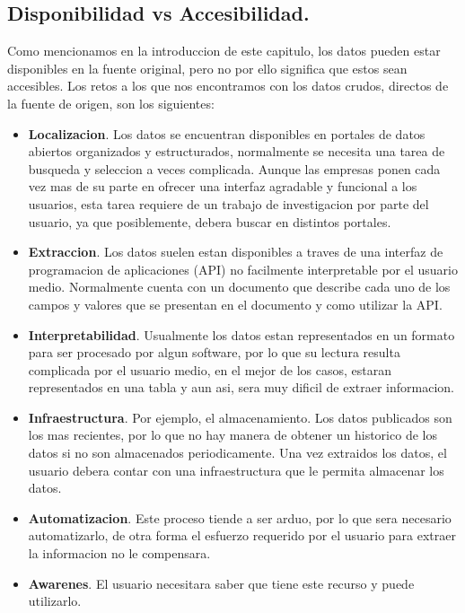 \subsection{Disponibilidad vs Accesibilidad.}
    
Como mencionamos en la introduccion de este capitulo, los datos pueden estar disponibles en la fuente original, pero no por
ello significa que estos sean accesibles.
Los retos a los que nos encontramos con los datos crudos, directos de la fuente de origen, son los siguientes:
    
    \begin{itemize}
        \item \textbf{Localizacion}. Los datos se encuentran disponibles en portales de datos abiertos organizados 
        y estructurados, normalmente se necesita una tarea de busqueda y seleccion
        a veces complicada. Aunque las empresas ponen cada vez mas de su parte en ofrecer una interfaz 
        agradable y funcional a los usuarios, esta tarea requiere de un trabajo de investigacion por parte del usuario,
        ya que posiblemente, debera buscar en distintos portales.
        \item \textbf{Extraccion}. Los datos suelen estan disponibles a traves de una interfaz de programacion 
        de aplicaciones (API) no facilmente interpretable por el usuario medio. Normalmente cuenta con 
        un documento que describe cada uno de los campos y valores que se presentan en el documento y como utilizar la API.
        \item \textbf{Interpretabilidad}. Usualmente los datos estan representados en un formato para ser procesado por 
        algun software, por lo que su lectura resulta complicada por el usuario medio, en el mejor de los casos, 
        estaran representados en una tabla y aun asi, sera muy dificil de extraer informacion.
        \item \textbf{Infraestructura}. Por ejemplo, el almacenamiento. Los datos publicados son los mas recientes, por lo que no hay manera de obtener 
        un historico de los datos si no son almacenados periodicamente. Una vez extraidos los datos, el usuario debera 
        contar con una infraestructura que le permita almacenar los datos.
        \item \textbf{Automatizacion}. Este proceso tiende a ser arduo, por lo que sera necesario automatizarlo, de otra 
        forma el esfuerzo requerido por el usuario para extraer la informacion no le compensara. 
        \item \textbf{Awarenes}. El usuario necesitara saber que tiene este recurso y puede utilizarlo.
         
    \end{itemize}
    
